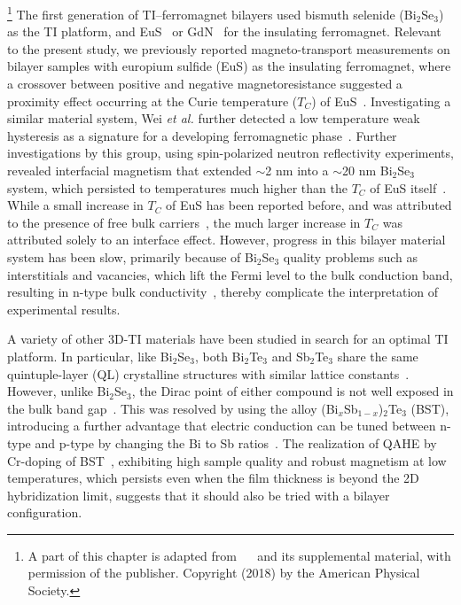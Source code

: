 \footnote[2]{A part of this chapter is adapted from ~\cite{bilayer2018}~ and its supplemental material, with permission of the publisher. Copyright (2018) by the American Physical Society.}%
%
The first generation of TI--ferromagnet bilayers used bismuth selenide (Bi$_2$Se$_3$) as the TI platform, and EuS~\cite{bilayer2014,Moodera2013} or GdN~\cite{Samarth2013} for the insulating ferromagnet. Relevant to the present study, we previously reported magneto-transport measurements on bilayer samples with europium sulfide (EuS) as the insulating ferromagnet, where a crossover between positive and negative magnetoresistance suggested a proximity effect occurring at the Curie temperature ($T_C$) of EuS~\cite{bilayer2014}. Investigating a similar material system, Wei {\it et al.} further detected a low temperature weak hysteresis as a signature for a developing ferromagnetic phase~\cite{Moodera2013}. Further investigations by this group, using spin-polarized neutron reflectivity experiments, revealed interfacial magnetism that extended $\sim$2 nm into a $\sim$20 nm Bi$_2$Se$_3$ system, which persisted to temperatures much higher than the $T_C$ of EuS itself~\cite{Moodera2016}. While a small increase in $T_C$ of EuS has been reported before, and was attributed to the presence of free bulk carriers~\cite{EuS_ntype, EuS_thin_film_Keller}, the much larger increase in $T_C$ was attributed solely to an interface effect. However, progress in this bilayer material system has been slow, primarily because of Bi$_2$Se$_3$ quality problems such as interstitials and vacancies, which lift the Fermi level to the bulk conduction band, resulting in n-type bulk conductivity~\cite{TI_ARPES1, zhangli2013, Zhanybek3, Fisher2010}, thereby complicate the interpretation of experimental results.

A variety of other 3D-TI materials have been studied in search for an optimal TI platform. In particular, like Bi$_2$Se$_3$, both Bi$_2$Te$_3$ and Sb$_2$Te$_3$ share the same quintuple-layer (QL) crystalline structures with similar lattice constants~\cite{SbStructure, BiStructure}. However, unlike Bi$_2$Se$_3$, the Dirac point of either compound is not well exposed in the bulk band gap~\cite{TI_electronic_structure_zhang}. This was resolved by using the alloy (Bi$_x$Sb$_{1-x}$)$_2$Te$_3$ (BST), introducing a further advantage that electric conduction can be tuned between n-type and p-type by changing the Bi to Sb ratios~\cite{ZhangJS2011}. The realization of QAHE by Cr-doping of BST~\cite{Chang2013, Kou2014}, exhibiting high sample quality and robust magnetism at low temperatures, which persists even when the film thickness is beyond the 2D hybridization limit, suggests that it should also be tried with a bilayer configuration.


